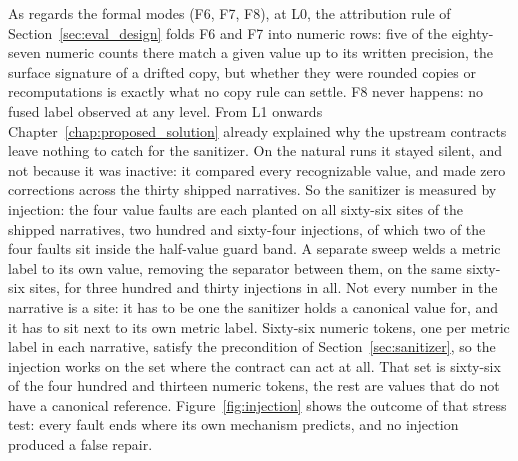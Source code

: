 \documentclass[12pt,a4paper,openright,twoside]{book}
\begin{document}
As regards the formal modes (F6, F7, F8), at L0, the attribution rule of Section~\ref{sec:eval_design} folds F6 and F7 into numeric rows: five of the eighty-seven numeric counts there match a given value up  to its written precision, the surface signature of a drifted copy, but whether they were rounded copies or recomputations is exactly what no copy rule can settle.
F8 never happens: no fused label observed at any level.
From L1 onwards Chapter~\ref{chap:proposed_solution} already explained why the upstream contracts leave nothing to catch for the sanitizer.
On the natural runs it stayed silent, and not because it was inactive: it compared every recognizable value, and made zero corrections across the thirty shipped narratives.
So the sanitizer is measured by injection: the four value faults are each planted on all sixty-six sites of the shipped narratives, two hundred and sixty-four injections, of which two of the four faults sit inside the half-value guard band.
A separate sweep welds a metric label to its own value, removing the separator between them, on the same sixty-six sites, for three hundred and thirty injections in all.
Not every number in the narrative is a site: it has to be one the sanitizer holds a canonical value for, and it has to sit next to its own metric label. 
Sixty-six numeric tokens, one per metric label in each narrative, satisfy the precondition of Section~\ref{sec:sanitizer}, so the injection works on the set where the contract can act at all.
That set is sixty-six of the four hundred and thirteen numeric tokens, the rest are values that do not have a canonical reference.
Figure~\ref{fig:injection} shows the outcome of that stress test: every fault ends where its own mechanism predicts, and no injection produced a false repair.
\end{document}
